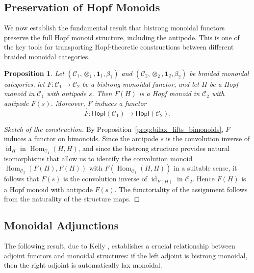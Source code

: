 \documentclass{amsart}
\newtheorem{proposition}{Proposition}[section]
\begin{document}
\subsection{Preservation of Hopf Monoids}

We now establish the fundamental result that bistrong monoidal functors preserve the full Hopf monoid structure, including the antipode. This is one of the key tools for transporting Hopf-theoretic constructions between different braided monoidal categories.

\begin{proposition}\label{prop:bistrong_preserves_hopf}
Let $(\mathcal{C}_1, \otimes_1, \mathbf{1}_1, \beta_1)$ and $(\mathcal{C}_2, \otimes_2, \mathbf{1}_2, \beta_2)$ be braided monoidal categories, let $F \colon \mathcal{C}_1 \longrightarrow \mathcal{C}_2$ be a bistrong monoidal functor, and let $H$ be a Hopf monoid in $\mathcal{C}_1$ with antipode $s$. Then $F(H)$ is a Hopf monoid in $\mathcal{C}_2$ with antipode $F(s)$. Moreover, $F$ induces a functor
\[
\widehat{F} \colon \mathsf{Hopf}(\mathcal{C}_1) \longrightarrow \mathsf{Hopf}(\mathcal{C}_2).
\]
\end{proposition}

\begin{proof}[Sketch of the construction]
By Proposition~\ref{prop:bilax_lifts_bimonoids}, $F$ induces a functor on bimonoids. Since the antipode $s$ is the convolution inverse of $\operatorname{id}_H$ in $\operatorname{Hom}_{\mathcal{C}_1}(H, H)$, and since the bistrong structure provides natural isomorphisms that allow us to identify the convolution monoid $\operatorname{Hom}_{\mathcal{C}_2}(F(H), F(H))$ with $F(\operatorname{Hom}_{\mathcal{C}_1}(H, H))$ in a suitable sense, it follows that $F(s)$ is the convolution inverse of $\operatorname{id}_{F(H)}$ in $\mathcal{C}_2$. Hence $F(H)$ is a Hopf monoid with antipode $F(s)$. The functoriality of the assignment follows from the naturality of the structure maps.
\end{proof}

\subsection{Monoidal Adjunctions}

The following result, due to Kelly \cite{DA}, establishes a crucial relationship between adjoint functors and monoidal structures: if the left adjoint is bistrong monoidal, then the right adjoint is automatically lax monoidal.
\end{document}
